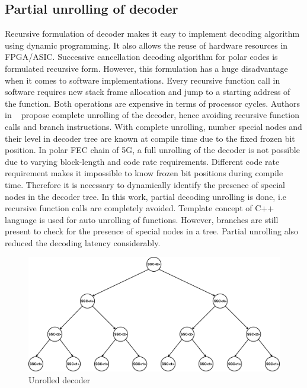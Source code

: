 \subsection{Partial unrolling of decoder}
Recursive formulation of decoder makes it easy to implement decoding algorithm using dynamic programming. It also allows the reuse of hardware resources in FPGA/ASIC. Successive cancellation decoding algorithm for polar codes is formulated recursive form. However, this formulation has a huge disadvantage when it comes to software implementations. Every recursive function call in software requires new stack frame allocation and jump to a starting address of the function. Both operations are expensive in terms of processor cycles. Authors in ~\cite{fastPolarDecodersAlgoImpl} propose complete unrolling of the decoder, hence avoiding recursive function calls and branch instructions. With complete unrolling, number special nodes and their level in decoder tree are known at compile time due to the fixed frozen bit position. In polar FEC chain of 5G, a full unrolling of the decoder is not possible due to varying block-length and code rate requirements. Different code rate requirement makes it impossible to know frozen bit positions during compile time. Therefore it is necessary to dynamically identify the presence of special nodes in the decoder tree. In this work, partial decoding unrolling is done, i.e recursive function calls are completely avoided. Template concept of C++ language is used for auto unrolling of functions. However, branches are still present to check for the presence of special nodes in a tree. Partial unrolling also reduced the decoding latency considerably.

\begin{figure}[]
	\centering
	\includegraphics[width=1\textwidth]{./figures/unrolledDecoder.pdf}
	\caption{Unrolled decoder}
	\label{fig:unrolledDecoder}
\end{figure}

